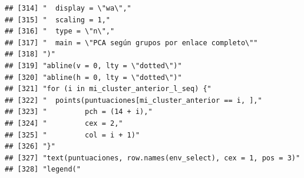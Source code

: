 \documentclass[11pt,]{article}
\begin{document}
\begin{verbatim}
## [314] "  display = \"wa\","                                                                                                                                                   
## [315] "  scaling = 1,"                                                                                                                                                        
## [316] "  type = \"n\","                                                                                                                                                       
## [317] "  main = \"PCA según grupos por enlace completo\""                                                                                                                     
## [318] ")"                                                                                                                                                                     
## [319] "abline(v = 0, lty = \"dotted\")"                                                                                                                                       
## [320] "abline(h = 0, lty = \"dotted\")"                                                                                                                                       
## [321] "for (i in mi_cluster_anterior_l_seq) {"                                                                                                                                
## [322] "  points(puntuaciones[mi_cluster_anterior == i, ],"                                                                                                                    
## [323] "         pch = (14 + i),"                                                                                                                                              
## [324] "         cex = 2,"                                                                                                                                                     
## [325] "         col = i + 1)"                                                                                                                                                 
## [326] "}"                                                                                                                                                                     
## [327] "text(puntuaciones, row.names(env_select), cex = 1, pos = 3)"                                                                                                           
## [328] "legend("                                                                                                                                                               

\end{verbatim}
\end{document}
